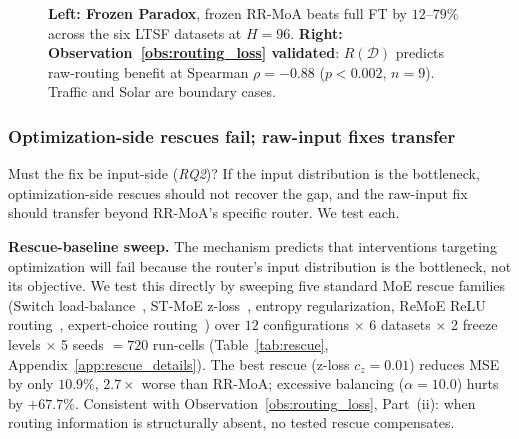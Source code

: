 \documentclass{article}
\begin{document}
\begin{figure}[!htbp]
\begin{minipage}[t]{0.40\columnwidth}
\end{minipage}
\caption{\textbf{Left: Frozen Paradox}, frozen RR-MoA beats full FT by $12$--$79\%$ across the six LTSF datasets at $H{=}96$. \textbf{Right: Observation~\ref{obs:routing_loss} validated}: $R(\mathcal{D})$ predicts raw-routing benefit at Spearman $\rho{=}{-}0.88$ ($p{<}0.002$, $n{=}9$). Traffic and Solar are boundary cases.}
\label{fig:frozen_paradox}
\label{fig:signal_ratio}
\end{figure}

\subsubsection*{Optimization-side rescues fail; raw-input fixes transfer}

Must the fix be input-side (\emph{RQ2})? If the input distribution is the bottleneck, optimization-side rescues should not recover the gap, and the raw-input fix should transfer beyond RR-MoA's specific router. We test each.

\textbf{Rescue-baseline sweep.} The mechanism predicts that interventions targeting optimization will fail because the router's input distribution is the bottleneck, not its objective. We test this directly by sweeping five standard MoE rescue families (Switch load-balance~\citep{fedus2022switch}, ST-MoE z-loss~\citep{zoph2022stmoe}, entropy regularization, ReMoE ReLU routing~\citep{wang2025remoe}, expert-choice routing~\citep{zhou2022expertchoice}) over $12$ configurations $\times$ 6 datasets $\times$ 2 freeze levels $\times$ 5 seeds $= 720$ run-cells (Table~\ref{tab:rescue}, Appendix~\ref{app:rescue_details}). The best rescue (z-loss $c_z{=}0.01$) reduces MSE by only $10.9\%$, $2.7{\times}$ worse than RR-MoA; excessive balancing ($\alpha{=}10.0$) hurts by $+67.7\%$. Consistent with Observation~\ref{obs:routing_loss}, Part~(ii): when routing information is structurally absent, no tested rescue compensates.
\end{document}
